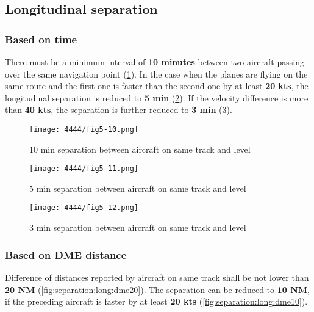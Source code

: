 \subsection{Longitudinal separation}

\subsubsection{Based on time}

There must be a minimum interval of \textbf{10 minutes} between two aircraft
passing over the same navigation point (\cref{fig:separation:long:10min}). In
the case when the planes are flying on the same route and the first one is
faster than the second one by at least \textbf{20 kts}, the longitudinal
separation is reduced to \textbf{5 min} (\cref{fig:separation:long:5min}). If
the velocity difference is more than \textbf{40 kts}, the separation is further
reduced to \textbf{3 min} (\cref{fig:separation:long:3min}).

\begin{figure}[htbp] \centering
\texttt{[image: 4444/fig5-10.png]}
  \caption{10 min separation between aircraft on same track and
level~\cite{4444}}
  \label{fig:separation:long:10min}
\end{figure}

\begin{figure}[htbp] \centering
\texttt{[image: 4444/fig5-11.png]}
  \caption{5 min separation between aircraft on same track and
level~\cite{4444}}
  \label{fig:separation:long:5min}
\end{figure}

\begin{figure}[htbp] \centering
\texttt{[image: 4444/fig5-12.png]}
  \caption{3 min separation between aircraft on same track and
level~\cite{4444}}
  \label{fig:separation:long:3min}
\end{figure}

\subsubsection{Based on DME distance}

Difference of distances reported by aircraft on same track shall be not lower
than \textbf{20 NM} (\cref{fig:separation:long:dme20}). The separation can be reduced to \textbf{10 NM}, if the preceding aircraft is
faster by at least \textbf{20 kts} (\cref{fig:separation:long:dme10}).

